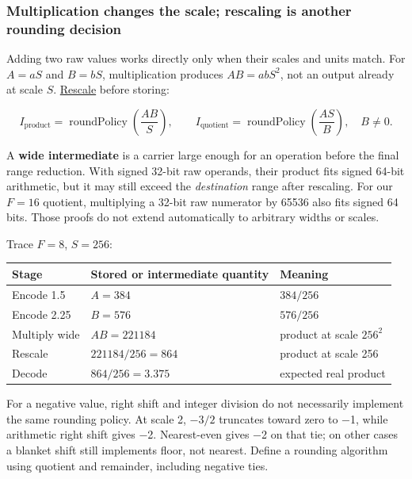\subsubsection{Multiplication changes the scale; rescaling is another rounding decision}\label{05-engine-i-ch001-multiplication-changes-the-scale-rescaling-is-another-rounding-decision}

Adding two raw values works directly only when their scales and units match. For \(A=aS\) and \(B=bS\), multiplication produces \(AB=abS^2\), not an output already at scale \(S\). \hyperref[appendix-3333db47830f]{Rescale} before storing:

\[
I_{\mathrm{product}}=\operatorname{roundPolicy}\!\left(\frac{AB}{S}\right),
\qquad
I_{\mathrm{quotient}}=\operatorname{roundPolicy}\!\left(\frac{AS}{B}\right),\quad B\ne0.
\]

A \textbf{wide intermediate} is a carrier large enough for an operation before the final range reduction. With signed 32-bit raw operands, their product fits signed 64-bit arithmetic, but it may still exceed the \emph{destination} range after rescaling. For our \(F=16\) quotient, multiplying a 32-bit raw numerator by 65536 also fits signed 64 bits. Those proofs do not extend automatically to arbitrary widths or scales.

Trace \(F=8\), \(S=256\):

{\def\LTcaptype{none} %
\begin{longtable}[]{@{}lll@{}}
\toprule\noalign{}
Stage & Stored or intermediate quantity & Meaning \\
\midrule\noalign{}
\endhead
\bottomrule\noalign{}
\endlastfoot
Encode 1.5 & \(A=384\) & \(384/256\) \\
Encode 2.25 & \(B=576\) & \(576/256\) \\
Multiply wide & \(AB=221184\) & product at scale \(256^2\) \\
Rescale & \(221184/256=864\) & product at scale 256 \\
Decode & \(864/256=3.375\) & expected real product \\
\end{longtable}
}

For a negative value, right shift and integer division do not necessarily implement the same rounding policy. At scale 2, \(-3/2\) truncates toward zero to −1, while arithmetic right shift gives −2. Nearest-even gives −2 on that tie; on other cases a blanket shift still implements floor, not nearest. Define a rounding algorithm using quotient and remainder, including negative ties.

